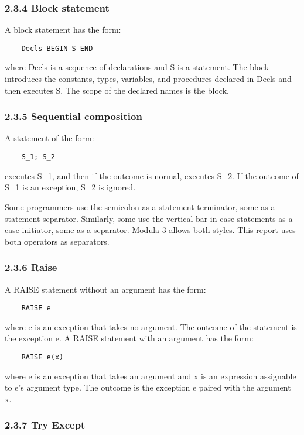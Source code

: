 \documentclass[10pt]{article}
\begin{document}
\subsubsection*{2.3.4 Block statement}

A block statement has the form:
\begin{verbatim}
    Decls BEGIN S END
\end{verbatim}
where Decls is a sequence of declarations and S is a statement. The block
introduces the constants, types, variables, and procedures declared in Decls
and then executes S. The scope of the declared names is the block.

\subsubsection*{2.3.5 Sequential composition}

A statement of the form:
\begin{verbatim}
    S_1; S_2
\end{verbatim}
executes S\_1, and then if the outcome is normal, executes S\_2. If the
outcome of S\_1 is an exception, S\_2 is ignored.

Some programmers use the semicolon as a statement terminator, some as a
statement separator. Similarly, some use the vertical bar in case statements
as a case initiator, some as a separator. Modula-3 allows both styles. This
report uses both operators as separators.

\subsubsection*{2.3.6 Raise}

A RAISE statement without an argument has the form:
\begin{verbatim}
    RAISE e
\end{verbatim}
where e is an exception that takes no argument. The outcome of the statement
is the exception e. A RAISE statement with an argument has the form:
\begin{verbatim}
    RAISE e(x)
\end{verbatim}
where e is an exception that takes an argument and x is an expression
assignable to e's argument type. The outcome is the exception e paired with
the argument x.

\subsubsection*{2.3.7 Try Except}
\end{document}
